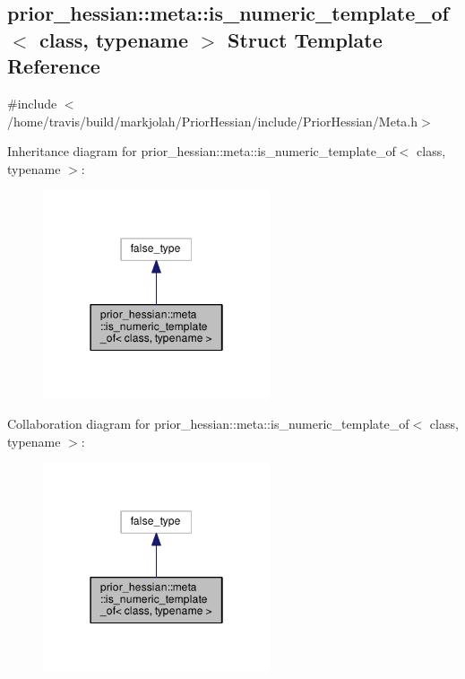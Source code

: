 \hypertarget{structprior__hessian_1_1meta_1_1is__numeric__template__of}{}\subsection{prior\+\_\+hessian\+:\+:meta\+:\+:is\+\_\+numeric\+\_\+template\+\_\+of$<$ class, typename $>$ Struct Template Reference}
\label{structprior__hessian_1_1meta_1_1is__numeric__template__of}


{\ttfamily \#include $<$/home/travis/build/markjolah/\+Prior\+Hessian/include/\+Prior\+Hessian/\+Meta.\+h$>$}



Inheritance diagram for prior\+\_\+hessian\+:\+:meta\+:\+:is\+\_\+numeric\+\_\+template\+\_\+of$<$ class, typename $>$\+:\nopagebreak
\begin{figure}[H]
\begin{center}
\leavevmode
\includegraphics[width=190pt]{structprior__hessian_1_1meta_1_1is__numeric__template__of__inherit__graph}
\end{center}
\end{figure}


Collaboration diagram for prior\+\_\+hessian\+:\+:meta\+:\+:is\+\_\+numeric\+\_\+template\+\_\+of$<$ class, typename $>$\+:\nopagebreak
\begin{figure}[H]
\begin{center}
\leavevmode
\includegraphics[width=190pt]{structprior__hessian_1_1meta_1_1is__numeric__template__of__coll__graph}
\end{center}
\end{figure}


